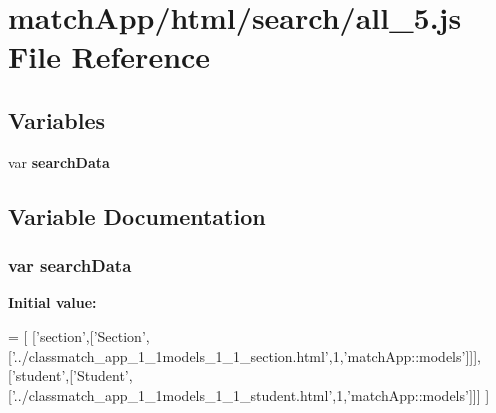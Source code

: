 \section{match\+App/html/search/all\+\_\+5.js File Reference}
\label{all__5_8js}
\subsection*{Variables}
\begin{DoxyCompactItemize}
\item 
var {\bf search\+Data}
\end{DoxyCompactItemize}


\subsection{Variable Documentation}
\subsubsection[{search\+Data}]{\setlength{\rightskip}{0pt plus 5cm}var search\+Data}\label{all__5_8js_ad01a7523f103d6242ef9b0451861231e}
{\bfseries Initial value\+:}
\begin{DoxyCode}
=
[
  [\textcolor{stringliteral}{'section'},[\textcolor{stringliteral}{'Section'},[\textcolor{stringliteral}{'../classmatch\_app\_1\_1models\_1\_1\_section.html'},1,\textcolor{stringliteral}{'matchApp::models'}]]],
  [\textcolor{stringliteral}{'student'},[\textcolor{stringliteral}{'Student'},[\textcolor{stringliteral}{'../classmatch\_app\_1\_1models\_1\_1\_student.html'},1,\textcolor{stringliteral}{'matchApp::models'}]]]
]
\end{DoxyCode}
